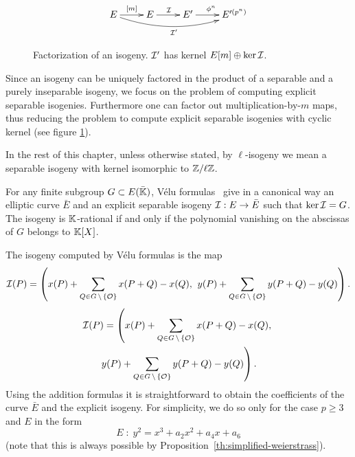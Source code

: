 \begin{figure}
  \centering
  \[\xymatrix{
    E \ar[r]^{[m]}\ar@/_1pc/[rrr]_{\I'} & E \ar[r]^\I & E' \ar[r]^{\frobisog^n} & E'^{(p^n)}
  }\]
  \label{fig:fact}
  \caption{Factorization of an isogeny. $\mathcal{I}'$ has kernel $E[m]\oplus\ker\mathcal{I}$.}
\end{figure}

Since an isogeny can be uniquely factored in the product of a
separable and a purely inseparable isogeny, we focus on the problem of
computing explicit separable isogenies. Furthermore one can factor out
multiplication-by-$m$ maps, thus reducing the problem to compute
explicit separable isogenies with cyclic kernel (see figure
\ref{fig:fact}).

In the rest of this chapter, unless otherwise stated, by
$\ell$-isogeny we mean a separable isogeny with kernel isomorphic to
$\mathbb{Z}/\ell\mathbb{Z}$.


For any finite subgroup $G \subset E(\bar{\mathbb{K}})$, Vélu
formulas~\cite{velu71} give in a canonical way an elliptic curve
$\bar{E}$ and an explicit separable isogeny $\mathcal{I}:E\rightarrow \bar{E}$
such that $\ker\mathcal{I}=G$. The isogeny is $\mathbb{K}$-rational if and only if the
polynomial vanishing on the abscissas of $G$ belongs to $\mathbb{K}[X]$.

The isogeny computed by Vélu formulas is the map
\ifafourps
\begin{equation}
  \label{eq:155}
  \mathcal{I}(P) = \left(x(P) + \sum_{Q\in G\,\backslash\,\{\mathcal{O}\}}x(P+Q) - x(Q),\right.
    \left.y(P) + \sum_{Q\in G\,\backslash\,\{\mathcal{O}\}}y(P+Q) - y(Q)\right)
  \text{.}
\end{equation}
\else
\begin{multline}
  \label{eq:155}
  \mathcal{I}(P) = \left(x(P) + \sum_{Q\in G\,\backslash\,\{\mathcal{O}\}}x(P+Q) - x(Q),\right.\\
    \left.y(P) + \sum_{Q\in G\,\backslash\,\{\mathcal{O}\}}y(P+Q) - y(Q)\right)
  \text{.}
\end{multline}
\fi
Using the addition formulas it is straightforward to obtain the
coefficients of the curve $\bar{E}$ and the explicit isogeny.  For
simplicity, we do so only for the case $p\ge3$ and $E$ in the form
\begin{equation}
  \label{eq:160}
  E \;:\; y^2 =  x^3 + a_2x^2 + a_4x + a_6
\end{equation}
(note that this is always possible by
Proposition~\ref{th:simplified-weierstrass}). 

